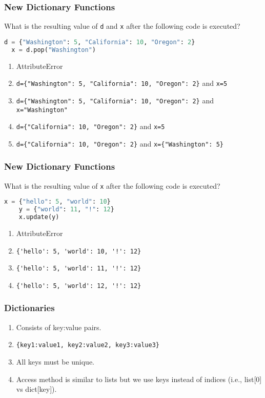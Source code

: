 \documentclass[xcolor=table]{beamer}
\begin{document}
%
%
\begin{frame}[fragile]
  \frametitle{New Dictionary Functions}
  What is the resulting value of \lstinline|d| and \lstinline|x| after the following code is executed?
  \begin{lstlisting}[language=Python, autogobble]
  d = {"Washington": 5, "California": 10, "Oregon": 2}
  x = d.pop("Washington")
  \end{lstlisting}
  \vfill
  \begin{enumerate}[A] 
    \item AttributeError
    \item \lstinline|d={"Washington": 5, "California": 10, "Oregon": 2}| and \lstinline|x=5|
    \item \lstinline|d={"Washington": 5, "California": 10, "Oregon": 2}| and  \lstinline|x="Washington"|
    \item \lstinline|d={"California": 10, "Oregon": 2}| and \lstinline|x=5|
    \item \lstinline|d={"California": 10, "Oregon": 2}| and \lstinline|x={"Washington": 5}|
  \end{enumerate}
\end{frame}

%
%
\begin{frame}[fragile]
  \frametitle{New Dictionary Functions}
  What is the resulting value of \lstinline|x| after the following code is executed?
  \begin{lstlisting}[language=Python, autogobble]
    x = {"hello": 5, "world": 10}
    y = {"world": 11, "!": 12}
    x.update(y)
  \end{lstlisting}
  \vfill
  \begin{enumerate}[A] 
    \item AttributeError
    \item \lstinline|{'hello': 5, 'world': 10, '!': 12}| 
    \item \lstinline|{'hello': 5, 'world': 11, '!': 12}| 
    \item \lstinline|{'hello': 5, 'world': 12, '!': 12}| 
  \end{enumerate}
\end{frame}

%
%
\begin{frame}[fragile]
  \frametitle{Dictionaries}
  \begin{enumerate}[A] 
    \item Consists of key:value pairs.
    \item \lstinline|{key1:value1, key2:value2, key3:value3}|
    \item All keys must be unique.
    \item Access method is similar to lists but we use keys instead of indices (i.e., list[0] vs dict[key]).
  \end{enumerate}
\end{frame}
\end{document}
